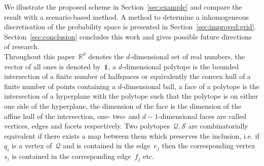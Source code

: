 \documentclass[letterpaper, 10pt, conference]{ieeeconf} %
\providecommand{\bfa}[1]{\mathbf{#1}}
\begin{document}
%
We illustrate the proposed scheme in Section~\ref{sec:example} and compare the result with a scenario-based method.
%
A method to determine a inhomogeneous discretisation of the probability space is presented in Section~\ref{sec:improved:grid}.
%
Section~\ref{sec:conclusion} concludes this work and gives possible future directions of research.
%
\\[1em]
%
Throughout this paper~$\mathbb R^d$ denotes the $d$-dimensional set of real numbers, the vector of all ones is denoted by~$\bfa{1}$, a $d$-dimensional polytope is the bounded intersection of a finite number of halfspaces or equivalently the convex hull of a finite number of points containing a $d$-dimensional ball, a face of a polytope is the intersection of a hyperplane with the polytope such that the polytope is on either one side of the hyperplane, the dimension of the face is the dimension of the affine hull of the intersection, one- two- and $d-1$-dimensional faces are called vertices, edges and facets respectively. 
%
Two polytopes~$\mathcal Q,\mathcal S$ are combinatorially equivalent if there exists a map between them which preserves the inclusion, i.e. if $q_i$ is a vertex of~$\mathcal Q$ and is contained in the edge~$e_j$ then the corresponding vertex~$s_i$ is contained in the corresponding edge~$f_j$ etc.
%
\end{document}
